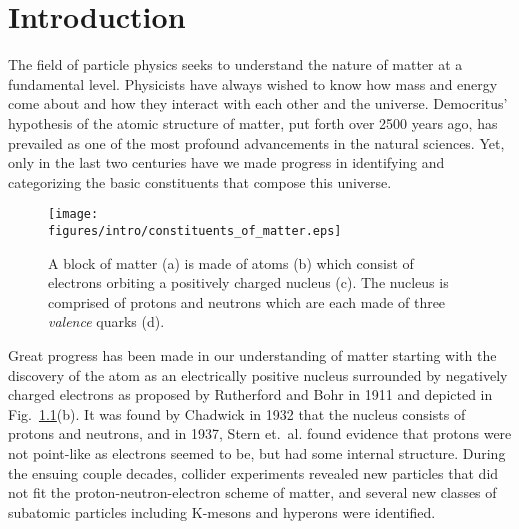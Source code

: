 \setcounter{chapter}{0}
\setcounter{secnumdepth}{-1}

\chapter{\label{sec:intro}Introduction}

The field of particle physics seeks to understand the nature of matter at a fundamental level. Physicists have always wished to know how mass and energy come about and how they interact with each other and the universe. Democritus' hypothesis of the atomic structure of matter, put forth over 2500 years ago, has prevailed as one of the most profound advancements in the natural sciences. Yet, only in the last two centuries have we made progress in identifying and categorizing the basic constituents that compose this universe.

\begin{figure}[b]
\begin{center}
    \texttt{[image: \\figures/intro/constituents\_of\_matter.eps]}
    \caption[History of Matter]{\label{fig:matter}A block of matter (a) is made of atoms (b) which consist of electrons orbiting a positively charged nucleus (c). The nucleus is comprised of protons and neutrons which are each made of three \emph{valence} quarks (d).}
\end{center}
\end{figure}

Great progress has been made in our understanding of matter starting with the discovery of the atom as an electrically positive nucleus surrounded by negatively charged electrons as proposed by Rutherford and Bohr\cite{rutherford1911} in 1911 and depicted in Fig.~\ref{fig:matter}(b). It was found by Chadwick\cite{chadwick1932} in 1932 that the nucleus consists of protons and neutrons, and in 1937, Stern et.\ al.\cite{PhysRev.52.535} found evidence that protons were not point-like as electrons seemed to be, but had some internal structure. During the ensuing couple decades, collider experiments revealed new particles that did not fit the proton-neutron-electron scheme of matter, and several new classes of subatomic particles including K-mesons and hyperons were identified.

